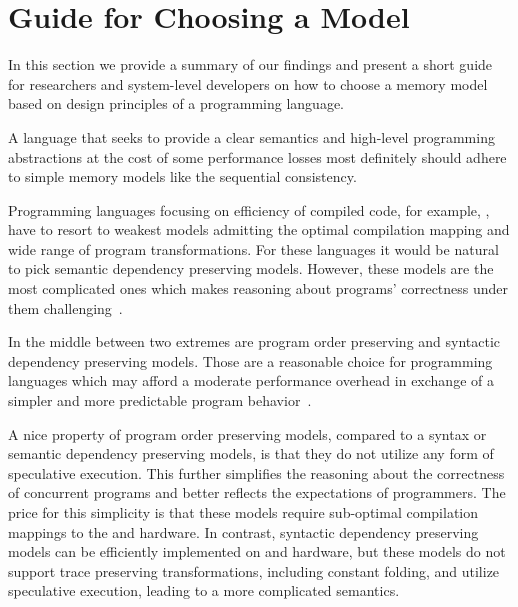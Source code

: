 \section{Guide for Choosing a Model}
\label{sec:discussion}

In this section we provide a summary of our findings
and present a short guide for researchers and system-level developers 
on how to choose a memory model based on 
design principles of a programming language.   

A language that seeks to provide a clear semantics and 
high-level programming abstractions at the cost 
of some performance losses most definitely should 
adhere to simple memory models like the sequential consistency. 

Programming languages focusing on efficiency 
of compiled code, for example, \CPP, 
have to resort to weakest models admitting 
the optimal compilation mapping 
and wide range of program transformations. 
For these languages it would be natural 
to pick semantic dependency preserving models.
However, these models are the most complicated ones
which makes reasoning about programs' correctness
under them challenging~\cite{Svendsen-al:ESOP18}.

In the middle between two extremes are program order preserving and 
syntactic dependency preserving models.
Those are a reasonable choice for programming languages
which may afford a moderate performance overhead 
in exchange of a simpler and more predictable program behavior~\cite{Ou-Demsky:OOPSLA18}.

A nice property of program order preserving models, compared 
to a syntax or semantic dependency preserving models, 
is that they do not utilize any form of speculative execution. 
This further simplifies the reasoning about the correctness
of concurrent programs and better reflects the 
expectations of programmers. 
The price for this simplicity is that 
these models require sub-optimal compilation mappings 
to the \ARM and \POWER hardware.
In contrast, syntactic dependency preserving models 
can be efficiently implemented on \ARM and \POWER hardware,
but these models do not support trace preserving transformations,
including constant folding, and utilize speculative execution, 
leading to a more complicated semantics.   


